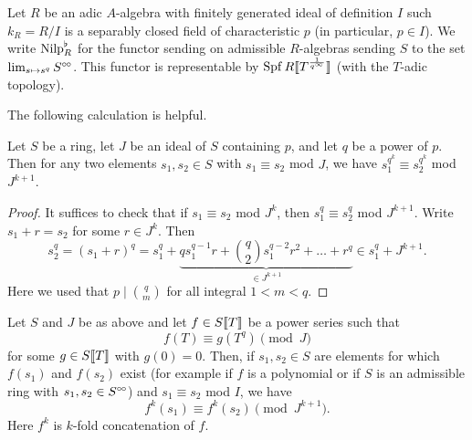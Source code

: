 Let $R$ be an adic $A$-algebra with finitely generated ideal of definition $I$ such
$k_R = R/I$ is a separably closed field of characteristic $p$ (in particular, $p \in I$). 
We write ${\mathrm{Nilp}}^\flat_R$ for the functor sending on admissible $R$-algebras sending
$S$ to the set $\lim_{s \mapsto s^q} S^{\circ \hspace{-0.5pt} \circ}$. This functor is representable by
$\operatorname{Spf} R\llbracket T^{\frac 1{q^\infty}} \rrbracket$ (with the $T$-adic topology).

The following calculation is helpful.
\begin{lem}\label{lem:cryscalc}
  Let $S$ be a ring, let $J$ be an ideal of $S$ containing $p$, and let $q$ be
  a power of $p$. 
  Then for any two elements $s_1, s_2 \in S$ with $s_1 \equiv s_2$ mod $J$, we have 
  $s_1^{q^k} \equiv s_2^{q^k}$ mod $J^{k+1}$. 
\begin{proof}
  It suffices to check that if $s_1 \equiv s_2$ mod $J^k$, then $s_1^q \equiv s_2^q$
  mod $J^{k+1}$. Write $s_1 + r = s_2$ for some $r \in J^k$. Then 
  \begin{equation*}
    s_2^q = (s_1 + r)^q = s_1^q + \underbrace{qs_1^{q-1} r + \binom q2
    s_1^{q-2}r^2 + \dots + r^q }_{\in J^{k+1}} \in s_1^q + J^{k+1}.
  \end{equation*}
  Here we used that $p \mid \binom qm$ for all integral $1 < m < q$.
\end{proof}
\end{lem}
\begin{cor}\label{cor:crystildecalc}
  Let $S$ and $J$ be as above and let $f \in S \llbracket T \rrbracket$ be a power series such
  that 
  \begin{equation*}
    f(T) \equiv g(T^{q}) \pmod J
  \end{equation*}
  for some $g \in S\llbracket T \rrbracket$ with $g(0) = 0$. Then, if $s_1, s_2 \in S$
  are elements for which $f(s_1)$ and $f(s_2)$ exist (for example if $f$ is a
  polynomial or if $S$ is an admissible ring with $s_1, s_2 \in S^{\circ \hspace{-0.5pt} \circ}$) and
  $s_1 \equiv s_2$ mod $I$, we have
  \begin{equation*}
    f^k(s_1) \equiv f^k(s_2) \pmod {J^{k+1}}.
  \end{equation*}
  Here $f^k$ is $k$-fold concatenation of $f$. 
\end{cor}

